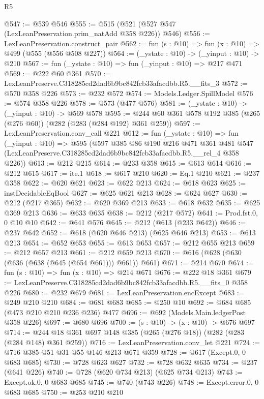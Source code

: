 \begin{lexlean}{R5}
\begin{coremodule}
@547 := @539 @546
@555 := @515 (@521 (@527 @547 (LexLeanPreservation.prim_natAdd @358 @226)) @546)
@556 := LexLeanPreservation.construct_pair
@562 := fun (s : @10) => fun (x : @10) => @499 (@555 (@556 @508 @227))
@564 := (_ystate : @10) -> (_yinput : @10) -> @210
@567 := fun (_ystate : @10) => fun (_yinput : @10) => @217 @471
@569 := @222 @60 @361
@570 := LexLeanPreserve.C318285cd2dad6b9bc842fcb33afacdbb.R5.__fits_3
@572 := @570 @358 @226
@573 := @232 @572
@574 := Models.Ledger.SpillModel
@576 := @574 @358 @226
@578 := @573 (@477 @576)
@581 := (_ystate : @10) -> (_yinput : @10) -> @569 @578
@595 := @244 @60 @361 @578 @192 @385 (@265 (@276 @60)) (@282 (@283 (@284 @192) @361 @259))
@597 := LexLeanPreservation.conv_call @221
@612 := fun (_ystate : @10) =>
  fun (_yinput : @10) =>
  @595
    (@597
      @385
      @86
      @190
      @216
      @471
      @361
      @481
      @547
      (LexLeanPreserve.C318285cd2dad6b9bc842fcb33afacdbb.R5.__rel_4 @358 @226))
@613 := @212 @215
@614 := @233 @358
@615 := @613 @614
@616 := @212 @615
@617 := ite.{1}
@618 := @617 @210
@620 := Eq.{1} @210
@621 := @237 @358
@622 := @620 @621
@623 := @622 @213
@624 := @618 @623
@625 := instDecidableEqBool
@627 := @625 @621 @213
@628 := @624 @627
@630 := @212 (@217 @365)
@632 := @620 @369 @213
@633 := @618 @632
@635 := @625 @369 @213
@636 := @633 @635
@638 := @212 (@217 @572)
@641 := Prod.fst.{0, 0} @10 @10
@642 := @641 @576
@645 := @212 (@613 (@233 @642))
@646 := @237 @642
@652 := @618 (@620 @646 @213) (@625 @646 @213)
@653 := @613 @213
@654 := @652 @653
@655 := @613 @653
@657 := @212 @655 @213
@659 := @212 @657 @213
@661 := @212 @659 @213
@670 := @616 (@628 (@630 (@636 (@638 (@645 (@654 @661))) @661)) @661)
@671 := @214 @670
@674 := fun (s : @10) => fun (x : @10) => @214 @671
@676 := @222 @18 @361
@679 := LexLeanPreserve.C318285cd2dad6b9bc842fcb33afacdbb.R5.__fits_0 @358 @226
@680 := @232 @679
@681 := LexLeanPreservation.encExcept
@683 := @249 @210 @210
@684 := @681 @683
@685 := @250 @10
@692 := @684 @685 (@473 @210 @210 @236 @236) @477
@696 := @692 (Models.Main.ledgerPost @358 @226)
@697 := @680 @696
@700 := (s : @10) -> (x : @10) -> @676 @697
@714 := @244 @18 @361 @697 @148 @385 (@265 (@276 @18)) (@282 (@283 (@284 @148) @361 @259))
@716 := LexLeanPreservation.conv_let @221
@724 := @716 @385 @51 @31 @55 @146 @213 @671 @359
@728 := @617 (Except.{0, 0} @683 @685)
@730 := @728 @623 @627
@732 := @728 @632 @635
@734 := @237 (@641 @226)
@740 := @728 (@620 @734 @213) (@625 @734 @213)
@743 := Except.ok.{0, 0} @683 @685
@745 := @740 (@743 @226)
@748 := Except.error.{0, 0} @683 @685
@750 := @253 @210 @210

\end{coremodule}
\end{lexlean}
